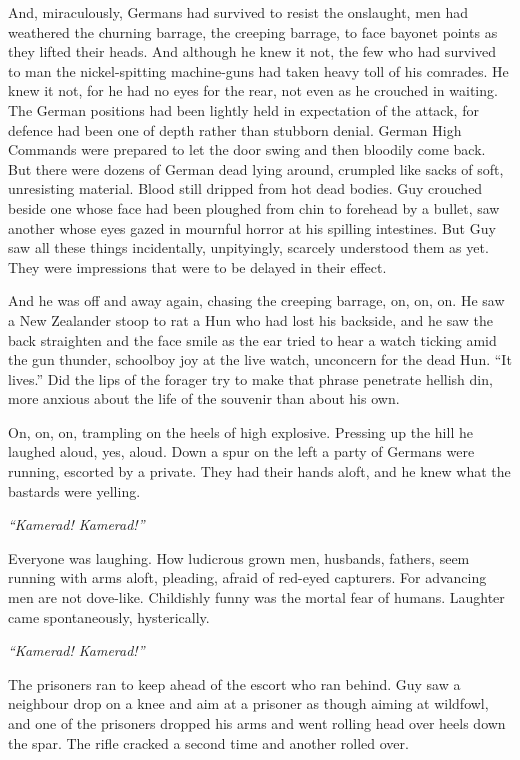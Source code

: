 And, miraculously, Germans had survived to resist the onslaught, men had weathered the churning barrage, the creeping barrage, to face bayonet points as they lifted their heads. And although he knew it not, the few who had survived to man the nickel-spitting machine-guns had taken heavy toll of his comrades. He knew it not, for he had no eyes for the rear, not even as he crouched in waiting. The German positions had been lightly held in expectation of the attack, for defence had been one of depth rather than stubborn denial. German High Commands were prepared to let the door swing and then bloodily come back. But there were dozens of German dead lying around, crumpled like sacks of soft, unresisting material. Blood still dripped from hot dead bodies. Guy crouched beside one whose face had been ploughed from chin to forehead by a bullet, saw another whose eyes gazed in mournful horror at his spilling intestines. But Guy saw all these things incidentally, unpityingly, scarcely understood them as yet. They were impressions that were to be delayed in their effect.

And he was off and away again, chasing the creeping barrage, on, on, on. He saw a New Zealander stoop to rat a Hun who had lost his backside, and he saw the back straighten and the face smile as the ear tried to hear a watch ticking amid the gun thunder, schoolboy joy at the live watch, unconcern for the dead Hun. ``It lives.'' Did the lips of the forager try to make that phrase penetrate hellish din, more anxious about the life of the souvenir than about his own.

On, on, on, trampling on the heels of high explosive. Pressing up the hill he laughed aloud, yes, aloud. Down a spur on the left a party of Germans were running, escorted by a private. They had their hands aloft, and he knew what the bastards were yelling.

\emph{``Kamerad! Kamerad!''}

Everyone was laughing. How ludicrous grown men, husbands, fathers, seem running with arms aloft, pleading, afraid of red-eyed capturers. For advancing men are not dove-like. Childishly funny was the mortal fear of humans. Laughter came spontaneously, hysterically.

\emph{``Kamerad! Kamerad!''}

The prisoners ran to keep ahead of the escort who ran behind. Guy saw a neighbour drop on a knee and aim at a prisoner as though aiming at wildfowl, and one of the prisoners dropped his arms and went rolling head over heels down the spar. The rifle cracked a second time and another rolled over.

